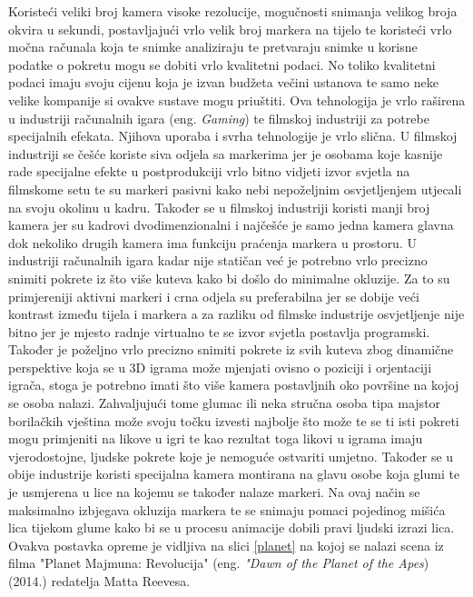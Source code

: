 \documentclass[times, utf8, diplomski]{fer}
\begin{document}
Koristeći veliki broj kamera visoke rezolucije, mogučnosti snimanja velikog broja okvira u sekundi, postavljajući vrlo velik broj 
markera na tijelo te koristeći vrlo močna računala koja te snimke analiziraju te pretvaraju snimke u korisne podatke o pokretu
mogu se dobiti vrlo kvalitetni podaci. No toliko kvalitetni podaci imaju svoju cijenu koja je izvan budžeta večini ustanova te samo 
neke velike kompanije si ovakve sustave mogu priuštiti. Ova tehnologija je vrlo raširena u industriji računalnih igara
(eng. \textit{Gaming}) te filmskoj industriji za potrebe specijalnih efekata. Njihova uporaba i svrha tehnologije je vrlo slična.
U filmskoj industriji se češće koriste siva odjela sa markerima jer je osobama koje kasnije rade specijalne efekte u postprodukciji
vrlo bitno vidjeti izvor svjetla na filmskome setu te su markeri pasivni kako nebi nepoželjnim osvjetljenjem utjecali na svoju
okolinu u kadru. Također se u filmskoj industriji koristi manji broj kamera jer su kadrovi dvodimenzionalni i najčešće je samo
jedna kamera glavna dok nekoliko drugih kamera ima funkciju praćenja markera u prostoru. U industriji računalnih igara kadar nije
statičan već je potrebno vrlo precizno snimiti pokrete iz što više kuteva kako bi došlo do minimalne okluzije. Za to su primjereniji
aktivni markeri i crna odjela su preferabilna jer se dobije veći kontrast između tijela i markera a za razliku od filmske industrije
osvjetljenje nije bitno jer je mjesto radnje virtualno te se izvor svjetla postavlja programski. Također je poželjno vrlo precizno
snimiti pokrete iz svih kuteva zbog dinamične perspektive koja se u 3D igrama može mjenjati ovisno o poziciji i orjentaciji igrača,
stoga je potrebno imati što više kamera postavljnih oko površine na kojoj se osoba nalazi. Zahvaljujući tome glumac ili neka stručna 
osoba tipa majstor borilačkih vještina može svoju točku izvesti najbolje što može te se ti isti pokreti mogu primjeniti na likove
u igri te kao rezultat toga likovi u igrama imaju vjerodostojne, ljudske pokrete koje je nemoguće ostvariti umjetno. Također se u
obije industrije koristi specijalna kamera montirana na glavu osobe koja glumi te je usmjerena u lice na kojemu se također nalaze
markeri. Na ovaj način se maksimalno izbjegava okluzija markera te se snimaju pomaci pojedinog mišića lica tijekom glume kako 
bi se u procesu animacije dobili pravi ljudski izrazi lica. Ovakva postavka opreme je vidljiva na slici \ref{planet} na kojoj se
nalazi scena iz filma "Planet Majmuna: Revolucija" (eng. \textit{"Dawn of the Planet of the Apes}) (2014.) redatelja Matta Reevesa.
\end{document}
